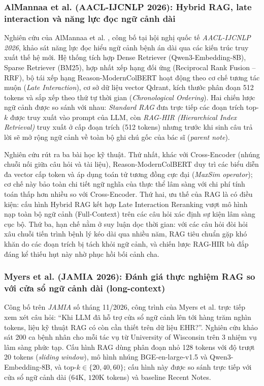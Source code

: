 \subsubsection{AlMannaa et al. (AACL-IJCNLP 2026): Hybrid RAG, late interaction và năng lực đọc ngữ cảnh dài}
Nghiên cứu của AlMannaa et al. \cite{almannaa2026investigating}, công bố tại hội nghị quốc tế \emph{AACL-IJCNLP 2026}, khảo sát năng lực đọc hiểu ngữ cảnh bệnh án dài qua các kiến trúc truy xuất thế hệ mới. Hệ thống tích hợp Dense Retriever (Qwen3-Embedding-8B), Sparse Retriever (BM25), hợp nhất xếp hạng đối ứng (Reciprocal Rank Fusion -- RRF), bộ tái xếp hạng Reason-ModernColBERT hoạt động theo cơ chế tương tác muộn (\emph{Late Interaction}), cơ sở dữ liệu vector Qdrant, kích thước phân đoạn 512 tokens và sắp xếp theo thứ tự thời gian (\emph{Chronological Ordering}). Hai chiến lược ngữ cảnh được so sánh với nhau: \emph{Standard RAG} đưa trực tiếp các đoạn trích top-$k$ được truy xuất vào prompt của LLM, còn \emph{RAG-HIR (Hierarchical Index Retrieval)} truy xuất ở cấp đoạn trích (512 tokens) nhưng trước khi sinh câu trả lời sẽ mở rộng ngữ cảnh về toàn bộ ghi chú gốc của bác sĩ (\emph{parent note}).

Nghiên cứu rút ra ba bài học kỹ thuật. Thứ nhất, khác với Cross-Encoder (nhúng chuỗi nối giữa câu hỏi và tài liệu), Reason-ModernColBERT duy trì các biểu diễn đa vector cấp token và áp dụng toán tử tương đồng cực đại (\emph{MaxSim operator}); cơ chế này bảo toàn chi tiết ngữ nghĩa của thực thể lâm sàng với chi phí tính toán thấp hơn nhiều so với Cross-Encoder. Thứ hai, ưu thế của RAG là có điều kiện: cấu hình Hybrid RAG kết hợp Late Interaction Reranking vượt mô hình nạp toàn bộ ngữ cảnh (Full-Context) trên các câu hỏi xác định sự kiện lâm sàng cục bộ. Thứ ba, hạn chế nằm ở suy luận dọc thời gian: với các câu hỏi đòi hỏi xâu chuỗi tiến trình bệnh lý kéo dài qua nhiều năm, RAG tiêu chuẩn gặp khó khăn do các đoạn trích bị tách khỏi ngữ cảnh, và chiến lược RAG-HIR bù đắp đáng kể thiếu hụt này nhờ phục hồi bối cảnh cha.

\subsubsection{Myers et al. (JAMIA 2026): Đánh giá thực nghiệm RAG so với cửa sổ ngữ cảnh dài (long-context)}
Công bố trên \emph{JAMIA} số tháng 11/2026, công trình của Myers et al. \cite{myers2026evaluating} trực tiếp xem xét câu hỏi: ``Khi LLM đã hỗ trợ cửa sổ ngữ cảnh lên tới hàng trăm nghìn tokens, liệu kỹ thuật RAG có còn cần thiết trên dữ liệu EHR?''. Nghiên cứu khảo sát 200 ca bệnh nhân cho mỗi tác vụ từ University of Wisconsin trên 3 nhiệm vụ lâm sàng phức tạp. Cấu hình RAG dùng phân đoạn nhỏ 128 tokens với độ trượt 20 tokens (\emph{sliding window}), mô hình nhúng BGE-en-large-v1.5 và Qwen3-Embedding-8B, và top-$k \in \{20, 40, 60\}$; cấu hình này được so sánh trực tiếp với cửa sổ ngữ cảnh dài ($64\text{K}$, $120\text{K}$ tokens) và baseline Recent Notes.


